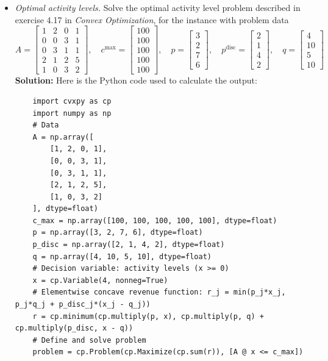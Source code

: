 \documentclass{article}
\newcommand{\disc}{\text{disc}}
\begin{document}
\begin{itemize}
  \item[2.] \textit{Optimal activity levels.} Solve the optimal activity level problem described in exercise 4.17 in \textit{Convex Optimization}, for the instance with problem data
  \[ A = \begin{bmatrix} 1 & 2 & 0 & 1 \\ 0 & 0 & 3 & 1 \\ 0 & 3 & 1 & 1 \\ 2 & 1 & 2 & 5 \\ 1 & 0 & 3 & 2 \end{bmatrix}, \quad
  c^{\max} = \begin{bmatrix} 100 \\ 100 \\ 100 \\ 100 \\ 100 \end{bmatrix}, \quad
  p = \begin{bmatrix} 3 \\ 2 \\ 7 \\ 6 \end{bmatrix}, \quad
  p^\disc = \begin{bmatrix} 2 \\ 1 \\ 4 \\ 2 \end{bmatrix}, \quad
  q = \begin{bmatrix} 4 \\ 10 \\ 5 \\ 10 \end{bmatrix} \]
  \textbf{Solution:} Here is the Python code used to calculate the output:
  \begin{lstlisting}
    import cvxpy as cp
    import numpy as np
    # Data
    A = np.array([
        [1, 2, 0, 1],
        [0, 0, 3, 1],
        [0, 3, 1, 1],
        [2, 1, 2, 5],
        [1, 0, 3, 2]
    ], dtype=float)
    c_max = np.array([100, 100, 100, 100, 100], dtype=float)
    p = np.array([3, 2, 7, 6], dtype=float)
    p_disc = np.array([2, 1, 4, 2], dtype=float)
    q = np.array([4, 10, 5, 10], dtype=float)
    # Decision variable: activity levels (x >= 0)
    x = cp.Variable(4, nonneg=True)
    # Elementwise concave revenue function: r_j = min(p_j*x_j, p_j*q_j + p_disc_j*(x_j - q_j))
    r = cp.minimum(cp.multiply(p, x), cp.multiply(p, q) + cp.multiply(p_disc, x - q))
    # Define and solve problem
    problem = cp.Problem(cp.Maximize(cp.sum(r)), [A @ x <= c_max])

\end{lstlisting}
\end{itemize}
\end{document}
